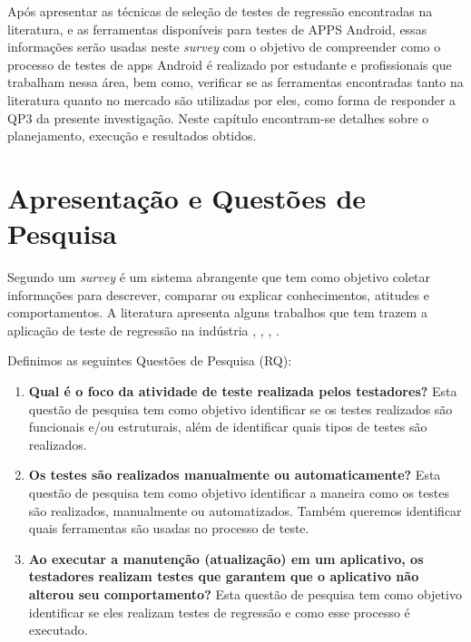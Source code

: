 \acresetall 

Após apresentar as técnicas de seleção de testes de regressão encontradas na literatura, e as ferramentas disponíveis para testes de \ac{APPS} Android, essas informações serão usadas neste \textit{survey} com o objetivo de compreender como o processo de testes de apps Android é realizado por estudante e profissionais que trabalham nessa área, bem como, verificar se as ferramentas encontradas tanto na literatura quanto no mercado são utilizadas por eles, como forma de responder a QP3 da presente investigação. Neste capítulo encontram-se detalhes sobre o planejamento, execução e resultados obtidos.


\section{Apresentação e Questões de Pesquisa}\label{rqsurvey}

Segundo \cite{PSK2001} um \textit{survey} é um sistema abrangente que tem como objetivo coletar informações para descrever, comparar ou explicar conhecimentos, atitudes e comportamentos. A literatura apresenta alguns trabalhos que tem trazem a aplicação de teste de regressão na indústria \cite{Ali2019}, \cite{8094467}, \cite{7102609}, \cite{630875}.

Definimos as seguintes Questões de Pesquisa (RQ):

\begin{enumerate}[label=\bf QP\arabic*,leftmargin=1.8cm]
    
    \item \textbf{Qual é o foco da atividade de teste realizada pelos testadores?} Esta questão de pesquisa tem como objetivo identificar se os testes realizados são funcionais e/ou estruturais, além de identificar quais tipos de testes são realizados.
    
    \item \textbf{Os testes são realizados manualmente ou automaticamente?} Esta questão de pesquisa tem como objetivo identificar a maneira como os testes são realizados, manualmente ou automatizados. Também queremos identificar quais ferramentas são usadas no processo de teste.
    
    \item \textbf{Ao executar a manutenção (atualização) em um aplicativo, os testadores realizam testes que garantem que o aplicativo não alterou seu comportamento?} Esta questão de pesquisa tem como objetivo identificar se eles realizam testes de regressão e como esse processo é executado.
    
\end{enumerate}

